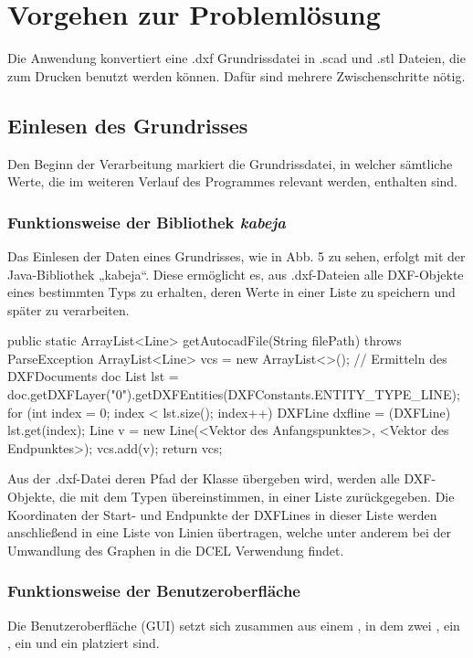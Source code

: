 \chapter{Vorgehen zur Problemlösung}
Die Anwendung konvertiert eine .dxf Grundrissdatei in .scad und .stl Dateien, die zum Drucken benutzt werden können.
Dafür sind mehrere Zwischenschritte nötig.
\section{Einlesen des Grundrisses}
Den Beginn der Verarbeitung markiert die Grundrissdatei, in welcher sämtliche Werte, die im weiteren Verlauf des Programmes relevant werden, enthalten sind.
\subsection{Funktionsweise der Bibliothek \textit{kabeja}}
Das Einlesen der Daten eines Grundrisses, wie in Abb. 5 zu sehen, erfolgt mit der Java-Bibliothek „kabeja“. 
Diese ermöglicht es, aus .dxf-Dateien alle DXF-Objekte eines bestimmten Typs zu erhalten, deren Werte in einer Liste zu speichern und später zu verarbeiten. \\

\begin{code}
public static ArrayList<Line> getAutocadFile(String filePath) throws ParseException {
	ArrayList<Line> vcs = new ArrayList<>();
	// Ermitteln des DXFDocuments doc
	List lst = doc.getDXFLayer("0").getDXFEntities(DXFConstants.ENTITY_TYPE_LINE);
	for (int index = 0; index < lst.size(); index++) {
		DXFLine dxfline = (DXFLine) lst.get(index);
		Line v = new Line(<Vektor des Anfangspunktes>, <Vektor des Endpunktes>);
		vcs.add(v);
	}
	return vcs;
}
\end{code}

Aus der .dxf-Datei deren Pfad der Klasse  übergeben wird, werden alle DXF-Objekte, die mit dem Typen  übereinstimmen, in einer Liste zurückgegeben. 
Die Koordinaten der Start- und Endpunkte der DXFLines  in dieser Liste werden anschließend in eine Liste von Linien übertragen, welche unter anderem bei der Umwandlung des Graphen in die DCEL Verwendung findet.

\subsection{Funktionsweise der Benutzeroberfläche}
Die Benutzeroberfläche (GUI) setzt sich zusammen aus einem , in dem zwei , ein , ein  und ein  platziert sind.

